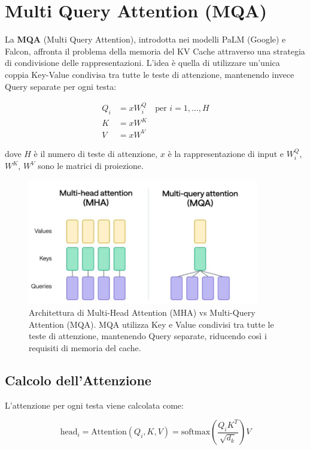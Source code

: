 \section{Multi Query Attention (MQA)}

La \textbf{MQA} (Multi Query Attention), introdotta nei modelli PaLM (Google) e Falcon, affronta il problema della memoria del KV Cache attraverso una strategia di condivisione delle rappresentazioni. L'idea è quella di utilizzare un'unica coppia Key-Value condivisa tra tutte le teste di attenzione, mantenendo invece Query separate per ogni testa:

\begin{align*}
    Q_i &= x W_i^Q \quad \text{per } i = 1, \ldots, H \\
    K &= x W^K \\
    V &= x W^V
\end{align*}

dove $H$ è il numero di teste di attenzione, $x$ è la rappresentazione di input e $W_i^Q$, $W^K$, $W^V$ sono le matrici di proiezione.

\begin{figure}
    \centering
    \includegraphics[width=0.9\textwidth]{figure/mha_vs_mqa_comparison.png}
    \caption{Architettura di Multi-Head Attention (MHA) vs Multi-Query Attention (MQA). MQA utilizza Key e Value condivisi tra tutte le teste di attenzione, mantenendo Query separate, riducendo così i requisiti di memoria del cache.}
    \label{fig:mha_vs_mqa}
\end{figure}

\subsection{Calcolo dell'Attenzione}
L'attenzione per ogni testa viene calcolata come:

\[
    \text{head}_i = \text{Attention}(Q_i, K, V) = \text{softmax}\left(\frac{Q_i K^T}{\sqrt{d_k}}\right) V
\]

